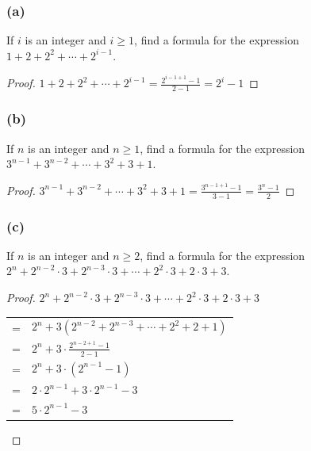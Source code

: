 \documentclass[14pt]{extarticle}
\newcommand{\dps}{\displaystyle}
\begin{document}
\subsubsection{(a)}
If $i$ is an integer and \(i \geq 1\), find a formula for
the expression \(1 + 2 + 2^2 + \cdots + 2^{i-1}\).

\begin{proof}
\(\dps 1 + 2 + 2^2 + \cdots + 2^{i-1} = \frac{2^{i-1+1} - 1}{2-1} = 2^i - 1\)
\end{proof}

\subsubsection{(b)}
If $n$ is an integer and \(n \geq 1\), find a formula for
the expression \(3^{n-1} + 3^{n-2} + \cdots + 3^2 + 3 + 1\).

\begin{proof}
\(\dps 3^{n-1} + 3^{n-2} + \cdots + 3^2 + 3 + 1 = \frac{3^{n-1+1} - 1}{3-1} = \frac{3^n - 1}{2}\)
\end{proof}

\subsubsection{(c)}
If $n$ is an integer and \(n \geq 2\), find a formula for
the expression 
\(2^n + 2^{n-2} \cdot 3 + 2^{n-3} \cdot 3 + \cdots + 2^2 \cdot 3 + 2 \cdot 3 + 3\).

\begin{proof}
\(2^n + 2^{n-2} \cdot 3 + 2^{n-3} \cdot 3 + \cdots + 2^2 \cdot 3 + 2 \cdot 3 + 3\)
\begin{center}
\begin{tabular}{cl}
= & \(2^n + 3(2^{n-2} + 2^{n-3} + \cdots + 2^2 + 2 + 1)\) \\
= & \(\dps 2^n + 3 \cdot \frac{2^{n-2+1} - 1}{2 - 1}\) \\
= & \(2^n + 3 \cdot (2^{n-1} - 1)\) \\
= & \(2 \cdot 2^{n-1} + 3 \cdot 2^{n-1} - 3\) \\
= & \(5 \cdot 2^{n-1} - 3\)
\end{tabular}
\end{center}
\end{proof}
\end{document}
